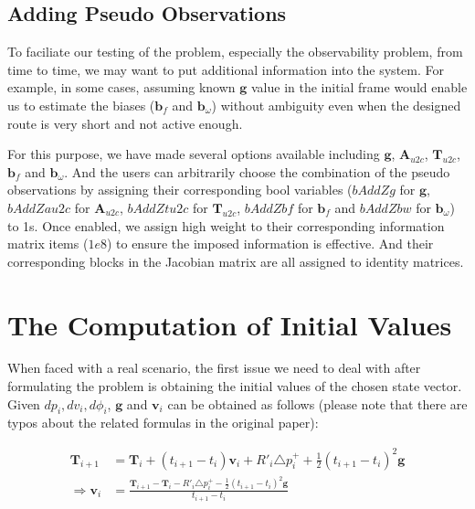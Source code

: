 \documentclass[12pt]{article}   %
\newcounter{case}
\begin{document}
\subsection{Adding Pseudo Observations}

To faciliate our testing of the problem, especially the observability problem, from time to time, we may want to put additional information into the system. For example, in some cases, assuming known $\textbf{g}$ value in the initial frame would enable us to estimate the biases ($\textbf{b}_f$ and $\textbf{b}_\omega$) without ambiguity even when the designed route is very short and not active enough.

For this purpose, we have made several options available including $\textbf{g}$, $\textbf{A}_{u2c}$, $\textbf{T}_{u2c}$, $\textbf{b}_f$ and $\textbf{b}_\omega$. And the users can arbitrarily choose the combination of the pseudo observations by assigning their corresponding bool variables ($bAddZg$ for $\textbf{g}$, $bAddZau2c$ for $\textbf{A}_{u2c}$, $bAddZtu2c$ for $\textbf{T}_{u2c}$, $bAddZbf$ for $\textbf{b}_f$ and $bAddZbw$ for $\textbf{b}_\omega$) to 1s. Once enabled, we assign high weight to their corresponding information matrix items ($1e8$) to ensure the imposed information is effective. And their corresponding blocks in the Jacobian matrix are all assigned to identity matrices.


\section{The Computation of Initial Values}

When faced with a real scenario, the first issue we need to deal with after formulating the problem is obtaining the initial values of the chosen state vector. Given $dp_i, dv_i, d\phi_i$, $\textbf{g}$ and $\textbf{v}_i$ can be obtained as follows (please note that there are typos about the related formulas in the original paper):

\begin{align}%
\textbf{T}_{i+1} &= \textbf{T}_{i} + (t_{i+1} - t_{i})\textbf{v}_i + R'_i \triangle p^{+}_{i} + \frac{1}{2} (t_{i+1} - t_{i})^2 \textbf{g} \nonumber \\
\Longrightarrow \textbf{v}_i &= \frac{\textbf{T}_{i+1} - \textbf{T}_{i} - R'_i \triangle p^{+}_{i} - \frac{1}{2} (t_{i+1} - t_{i})^2 \textbf{g}}{t_{i+1} - t_{i}} \nonumber \\
\end{align}
\end{document}
